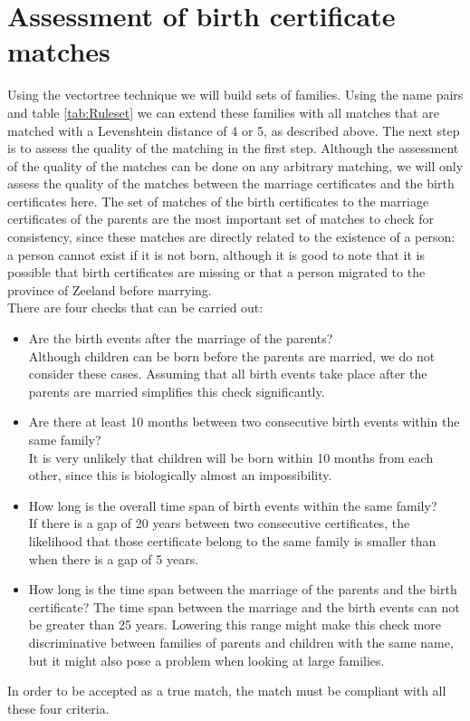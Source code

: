\section{Assessment of birth certificate matches}
Using the vectortree technique we will build sets of families. Using the name pairs and table \ref{tab:Ruleset} we can extend these families with all matches that are matched with a Levenshtein distance of 4 or 5, as described above. The next step is to assess the quality of the matching in the first step. 
Although the assessment of the quality of the matches can be done on any arbitrary matching, we will only assess the quality of the matches between the marriage certificates and the birth certificates here. The set of matches of the birth certificates to the marriage certificates of the parents are the most important set of matches to check for consistency, since these matches are directly related to the existence of a person: a person cannot exist if it is not born, although it is good to note that it is possible that birth certificates are missing or that a person migrated to the province of Zeeland before marrying. \\

There are four checks that can be carried out: 
\begin{itemize}
	\item Are the birth events after the marriage of the parents? \\
	Although children can be born before the parents are married, we do not consider these cases. Assuming that all birth events take place after the parents are married simplifies this check significantly. 
	\item Are there at least 10 months between two consecutive birth events within the same family?\\
	It is very unlikely that children will be born within 10 months from each other, since this is biologically almost an impossibility. 
	\item How long is the overall time span of birth events within the same family?\\
	If there is a gap of 20 years between two consecutive certificates, the likelihood that those certificate belong to the same family is smaller than when there is a gap of 5 years. 
	\item How long is the time span between the marriage of the parents and the birth certificate?
	The time span between the marriage and the birth events can not be greater than 25 years. Lowering this range might make this check more discriminative between families of parents and children with the same name, but it might also pose a problem when looking at large families. 
\end{itemize} 

In order to be accepted as a true match, the match must be compliant with all these four criteria.

 
